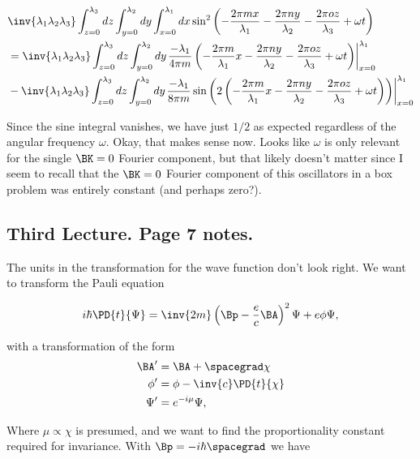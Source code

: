 \begin{align*}
&\inv{\lambda_1 \lambda_2 \lambda_3} 
\int_{z=0}^{\lambda_3} dz
\int_{y=0}^{\lambda_2} dy
\int_{x=0}^{\lambda_1}
dx \sin^2 \left( 
-\frac{2 \pi m x}{\lambda_1} 
-\frac{2 \pi n y}{\lambda_2} 
-\frac{2 \pi o z}{\lambda_3} 
+ \omega t \right) \\
&=
\inv{\lambda_1 \lambda_2 \lambda_3} 
\int_{z=0}^{\lambda_3} dz
\int_{y=0}^{\lambda_2} dy
{\left.
\frac{-\lambda_1}{4 \pi m} \left( 
-\frac{2 \pi m }{\lambda_1} x 
-\frac{2 \pi n y}{\lambda_2} 
-\frac{2 \pi o z}{\lambda_3} 
+ \omega t \right)
\right\vert}_{x=0}^{\lambda_1} \\
&-
\inv{\lambda_1 \lambda_2 \lambda_3} 
\int_{z=0}^{\lambda_3} dz
\int_{y=0}^{\lambda_2} dy
{\left.
\frac{-\lambda_1}{8 \pi m} 
\sin \left( 2 \left(
-\frac{2 \pi m }{\lambda_1} x 
-\frac{2 \pi n y}{\lambda_2} 
-\frac{2 \pi o z}{\lambda_3} 
+ \omega t \right) \right)
\right\vert}_{x=0}^{\lambda_1}
\end{align*}

Since the sine integral vanishes, we have just $1/2$ as expected regardless of the angular frequency $\omega$.  Okay, that makes sense now.  Looks like $\omega$ is only relevant for the single $\BK = 0$ Fourier component, but that likely doesn't matter since I seem to recall that the $\BK = 0$ Fourier component of this oscillators in a box problem was entirely constant (and perhaps zero?).

\subsection{Third Lecture.  Page 7 notes.}

The units in the transformation for the wave function don't look right.  We want to transform the Pauli equation

\begin{align*}
i \hbar \PD{t}{\Psi} = \inv{2 m} \left( \Bp - \frac{e}{c} \BA \right)^2 \Psi + e \phi \Psi,
\end{align*}

with a transformation of the form
\begin{align*}
\BA' &= \BA + \spacegrad \chi \\
\phi' &= \phi - \inv{c} \PD{t}{\chi} \\
\Psi' &= e^{-i \mu} \Psi,
\end{align*}

Where $\mu \propto \chi$ is presumed, and we want to find the proportionality constant required for invariance.  With $\Bp = - i \hbar \spacegrad$ we have

